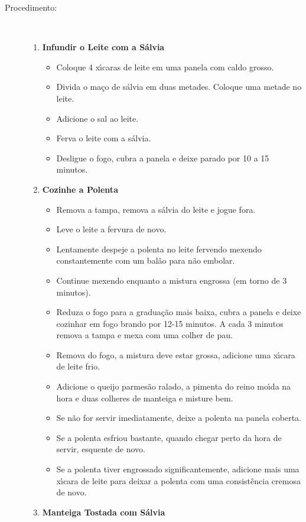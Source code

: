 \documentclass[11pt,letterpaper]{article}
\begin{document}
\begin{description}
\item[Procedimento:]\ \\
	\begin{enumerate}
	\item {\bf Infundir o Leite com a S\'alvia}
	\begin{itemize}
	\item Coloque 4 x\'{\i}caras de leite em uma panela com caldo grosso.
	\item Divida o ma\c{c}o de s\'alvia em duas metades. Coloque uma metade no leite.
	\item Adicione o sal ao leite.
	\item Ferva o leite com a s\'alvia.
	\item Desligue o fogo, cubra a panela e deixe parado por 10 a 15 minutos.
	\end{itemize}
	\item {\bf Cozinhe a Polenta}
	\begin{itemize}
	\item Remova a tampa, remova a s\'alvia do leite e jogue fora.
	 \item Leve o leite a fervura de novo.
	 \item Lentamente despeje a polenta no leite fervendo mexendo constantemente com um bal\~ao para n\~ao embolar.
	 \item Continue mexendo enquanto a mistura engrossa (em torno de 3 minutos).
	 \item Reduza o fogo para a gradua\c{c}\~ao mais baixa, cubra a panela e deixe cozinhar em fogo brando por 12-15 minutos. A cada 3 minutos remova a tampa e mexa com uma colher de pau.
	 \item Remova do fogo, a mistura deve estar grossa, adicione uma x\'{\i}cara de leite frio.
	 \item  Adicione o queijo parmes\~ao ralado, a pimenta do reino mo\'{\i}da na hora e duas colheres de manteiga e misture bem. 
	 \item Se n\~ao for servir imediatamente, deixe a polenta na panela coberta.
	 \item Se a polenta esfriou bastante, quando chegar perto da hora de servir, esquente de novo.
	 \item Se a polenta tiver engrossado significantemente, adicione mais uma x\'{\i}cara de leite para deixar a polenta com uma consist\^encia cremosa de novo. 
	 \end{itemize}
	\item {\bf Manteiga Tostada com S\'alvia}
	\begin{itemize}

\end{itemize}
\end{enumerate}
\end{description}
\end{document}
